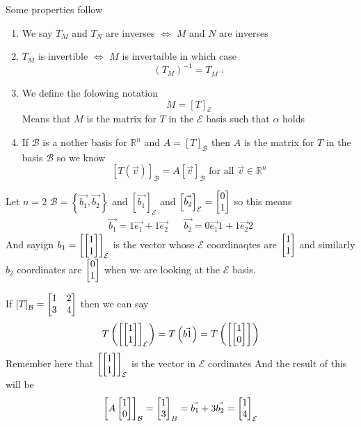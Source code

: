 \documentclass[11pt]{book}
\begin{document}
Some properties follow
\begin{enumerate}
    \item We say $T_{M} $ and $T_{N} $ are inverses $\Leftrightarrow$ $M$ and $N$ are inverses  
    \item $T_{M} $ is invertible $\Leftrightarrow$ $M$ is invertaible in which case
        \[
            \left( T_{M}  \right) ^{-1} = T_{M^{-1} } 
        \]
    \item We define the folowing notation 
        \[
        M= \left[ T \right]_{\mathcal{E}} 
        \]
        Means that $M$ is the matrix for $T$ in the $\mathcal{E} $ basis such that $\alpha $  holds
    \item If $\mathcal{B} $ is a nother basis for $\mathbb{R} ^{n} $ and $A= \left[ T \right]_{\mathcal{B}} $ then $A$ is the matrix for $T$ in the basis $\mathcal{B} $ so we know 
        \begin{equation*}
            \left[ T\left(\vec{v} \right) \right]_{\mathcal{B}} = A\left[ \vec{v}  \right]_{\mathcal{B}} \text{ for all  } \vec{v} \in \mathbb{R} ^{n} 
        \end{equation*}
\end{enumerate}

\begin{eg}
    Let $n= 2$ $\mathcal{B} = \left\{ \vec{b_1} , \vec{b_2}  \right\} $ and $\left[ \vec{b_1}  \right]_{\mathcal{E}} $ and $\left[ \vec{b_2}  \right]_{\mathcal{E}} = \begin{bmatrix} 0 \\ 1 \end{bmatrix} $ so this means
    \begin{align*}
        \vec{b_1} = 1\vec{e_1}  + 1\vec{e_2}  && \vec{b_2} = 0\vec{e_1} 1 + 1\vec{e_2} 2
    \end{align*}
    And sayign $b_1= \left[ \begin{bmatrix} 1 \\ 1 \end{bmatrix}  \right]_{\mathcal{E}} $ is the vector whose $\mathcal{E} $ coordinaqtes are $\begin{bmatrix} 1 \\ 1 \end{bmatrix} $ and similarly $b_2$ coordinates are $\begin{bmatrix} 0 \\ 1 \end{bmatrix} $ when we are looking at the $\mathcal{E} $ basis. 
\end{eg}

\begin{eg}
    If $\left[ T \right]_{\mathcal{B}} = \begin{bmatrix} 1 & 2 \\ 3 & 4 \end{bmatrix}$ then we can say 
    \begin{equation*}
        T\left(\left[ \begin{bmatrix} 1 \\ 1 \end{bmatrix}  \right]_{\mathcal{E}} \right)= T\left(\vec{b1} \right)= T\left(\left[ \begin{bmatrix} 1 \\ 0 \end{bmatrix}  \right]_{\mathcal{}} \right)
    \end{equation*}
    Remember here that $\left[ \begin{bmatrix} 1 \\ 1 \end{bmatrix}  \right]_{\mathcal{E}} $ is the vector in $\mathcal{E} $ cordinates 
    And the result of this will be 
    \[
    \left[ A \begin{bmatrix} 1 \\ 0 \end{bmatrix}  \right]_{\mathcal{B}} = \begin{bmatrix} 1 \\ 3 \end{bmatrix} _{B} = \vec{b_1}  + 3\vec{b_2} = \begin{bmatrix} 1 \\ 4 \end{bmatrix} _{\mathcal{E} } 
    \]
\end{eg}
\end{document}
